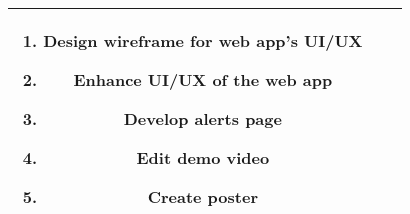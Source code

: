 \begin{table}[htbp]
\begin{center}
\begin{tabular}{|c|c|p{3cm}|}
\begin{enumerate}[leftmargin=*]
				                                         \item Design wireframe for web app's UI/UX
				                                         \item Enhance UI/UX of the web app
				                                         \item Develop alerts page
				                                         \item Edit demo video
				                                         \item Create poster
			                                         \end{enumerate}
			\\
			\hline
		\end{tabular}
		\label{tab-divsion-of-task}
	\end{center}
\end{table}
